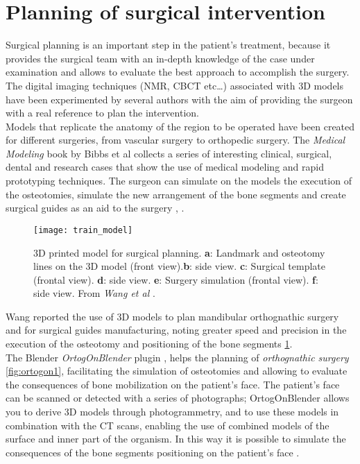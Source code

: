 \section{Planning of surgical intervention}
Surgical planning is an important step in the patient's treatment, because it provides the surgical team with an in-depth knowledge of the case under examination and allows to evaluate the best approach to accomplish the surgery. The digital imaging techniques (NMR, CBCT etc\ldots) associated with 3D models have been experimented by several authors with the aim of providing the surgeon with a real reference to plan the intervention. \\ Models that replicate the anatomy of the region to be operated have been created for different surgeries, from vascular surgery to orthopedic surgery. The \emph{Medical Modeling} book by Bibbs et al \parencite{Reference1} collects a series of interesting clinical, surgical, dental and research cases that show the use of medical modeling and rapid prototyping techniques. The surgeon can simulate on the models the execution of the osteotomies, simulate the new arrangement of the bone segments and create surgical guides as an aid to the surgery \parencite{Reference77}, \parencite{Reference78}.
\begin{figure}[h]
\vspace{-10pt}
	\begin{center}
	\texttt{[image: train\_model]}
    \caption{3D printed model for surgical planning.
\textbf{a}: Landmark and osteotomy lines on the 3D model (front view).\textbf{b}: side view. \textbf{c}: Surgical template (frontal view). \textbf{d}: side view. \textbf{e}: Surgery simulation (frontal view). \textbf{f}: side view. From \emph{Wang et al} \parencite{Reference20}.}
    \label{fig:train_model}
    \end{center}
\vspace{-20pt}
\end{figure}

Wang \parencite{Reference109} reported the use of 3D models to plan mandibular orthognathic surgery and for surgical guides manufacturing, noting greater speed and precision in the execution of the osteotomy and positioning of the bone segments \ref{fig:train_model}. \\
The Blender \emph{OrtogOnBlender} plugin \parencite{Reference64}, \parencite{Reference79} helps the planning of \emph{orthognathic surgery} \ref{fig:ortogon1}, facilitating the simulation of osteotomies and allowing to evaluate the consequences of bone mobilization on the patient's face. The patient's face can be scanned or detected with a series of photographs; OrtogOnBlender allows you to derive 3D models through photogrammetry, and to use these models in combination with the CT scans, enabling the use of combined models of the surface and inner part of the organism. In this way it is possible to simulate the consequences of the bone segments positioning on the patient's face  \parencite{Reference145}.

